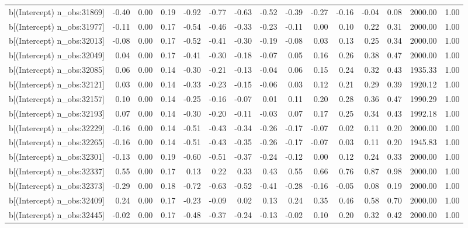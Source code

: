 \begin{table}[ht]
\begin{tabular}{rrrrrrrrrrrrrrr}
  b[(Intercept) n\_obs:31869] & -0.40 & 0.00 & 0.19 & -0.92 & -0.77 & -0.63 & -0.52 & -0.39 & -0.27 & -0.16 & -0.04 & 0.08 & 2000.00 & 1.00 \\ 
  b[(Intercept) n\_obs:31977] & -0.11 & 0.00 & 0.17 & -0.54 & -0.46 & -0.33 & -0.23 & -0.11 & 0.00 & 0.10 & 0.22 & 0.31 & 2000.00 & 1.00 \\ 
  b[(Intercept) n\_obs:32013] & -0.08 & 0.00 & 0.17 & -0.52 & -0.41 & -0.30 & -0.19 & -0.08 & 0.03 & 0.13 & 0.25 & 0.34 & 2000.00 & 1.00 \\ 
  b[(Intercept) n\_obs:32049] & 0.04 & 0.00 & 0.17 & -0.41 & -0.30 & -0.18 & -0.07 & 0.05 & 0.16 & 0.26 & 0.38 & 0.47 & 2000.00 & 1.00 \\ 
  b[(Intercept) n\_obs:32085] & 0.06 & 0.00 & 0.14 & -0.30 & -0.21 & -0.13 & -0.04 & 0.06 & 0.15 & 0.24 & 0.32 & 0.43 & 1935.33 & 1.00 \\ 
  b[(Intercept) n\_obs:32121] & 0.03 & 0.00 & 0.14 & -0.33 & -0.23 & -0.15 & -0.06 & 0.03 & 0.12 & 0.21 & 0.29 & 0.39 & 1920.12 & 1.00 \\ 
  b[(Intercept) n\_obs:32157] & 0.10 & 0.00 & 0.14 & -0.25 & -0.16 & -0.07 & 0.01 & 0.11 & 0.20 & 0.28 & 0.36 & 0.47 & 1990.29 & 1.00 \\ 
  b[(Intercept) n\_obs:32193] & 0.07 & 0.00 & 0.14 & -0.30 & -0.20 & -0.11 & -0.03 & 0.07 & 0.17 & 0.25 & 0.34 & 0.43 & 1992.18 & 1.00 \\ 
  b[(Intercept) n\_obs:32229] & -0.16 & 0.00 & 0.14 & -0.51 & -0.43 & -0.34 & -0.26 & -0.17 & -0.07 & 0.02 & 0.11 & 0.20 & 2000.00 & 1.00 \\ 
  b[(Intercept) n\_obs:32265] & -0.16 & 0.00 & 0.14 & -0.51 & -0.43 & -0.35 & -0.26 & -0.17 & -0.07 & 0.03 & 0.11 & 0.20 & 1945.83 & 1.00 \\ 
  b[(Intercept) n\_obs:32301] & -0.13 & 0.00 & 0.19 & -0.60 & -0.51 & -0.37 & -0.24 & -0.12 & 0.00 & 0.12 & 0.24 & 0.33 & 2000.00 & 1.00 \\ 
  b[(Intercept) n\_obs:32337] & 0.55 & 0.00 & 0.17 & 0.13 & 0.22 & 0.33 & 0.43 & 0.55 & 0.66 & 0.76 & 0.87 & 0.98 & 2000.00 & 1.00 \\ 
  b[(Intercept) n\_obs:32373] & -0.29 & 0.00 & 0.18 & -0.72 & -0.63 & -0.52 & -0.41 & -0.28 & -0.16 & -0.05 & 0.08 & 0.19 & 2000.00 & 1.00 \\ 
  b[(Intercept) n\_obs:32409] & 0.24 & 0.00 & 0.17 & -0.23 & -0.09 & 0.02 & 0.13 & 0.24 & 0.35 & 0.46 & 0.58 & 0.70 & 2000.00 & 1.00 \\ 
  b[(Intercept) n\_obs:32445] & -0.02 & 0.00 & 0.17 & -0.48 & -0.37 & -0.24 & -0.13 & -0.02 & 0.10 & 0.20 & 0.32 & 0.42 & 2000.00 & 1.00 \\ 

\end{tabular}
\end{table}
